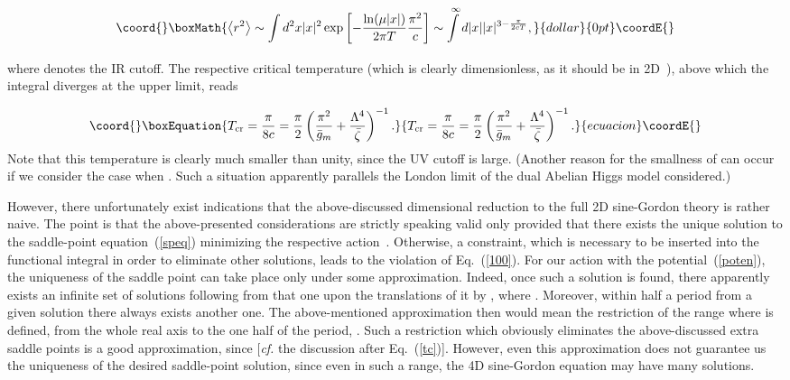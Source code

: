 \documentclass[a4paper,12pt]{article}
\begin{document}
$$\coord{}\boxMath{\left<r^2\right>\sim\int d^2x |x|^2\exp\left[-\frac{\ln(\mu|x|)}{2\pi T}\frac{\pi^2}{c}\right]\sim
\int\limits_{}^{\infty} d|x||x|^{3-\frac{\pi}{2cT}},}{dollar}{0pt}\coordE{}$$ 
where \myHighlight{$\mu$}\coordHE{} denotes the IR cutoff. The respective critical temperature (which is clearly dimensionless, as it 
should be in 2D~\cite{bkt}), above which the integral diverges at the upper limit, reads

\begin{equation}\coord{}\boxEquation{
\label{tc}
T_{\rm cr}=\frac{\pi}{8c}=\frac{\pi}{2}\left(\frac{\pi^2}{\bar g_m}+\frac{\Lambda^4}{\bar\zeta}\right)^{-1}.
}{
T_{\rm cr}=\frac{\pi}{8c}=\frac{\pi}{2}\left(\frac{\pi^2}{\bar g_m}+\frac{\Lambda^4}{\bar\zeta}\right)^{-1}.
}{ecuacion}\coordE{}\end{equation}
Note that this temperature is clearly much smaller than unity, since the UV cutoff \myHighlight{$\Lambda$}\coordHE{} is large.
(Another reason for the smallness of \coordHE{} can occur if we consider the case when \coordHE{}.
Such a situation apparently parallels the London limit of the dual Abelian Higgs model considered.)

However, there unfortunately exist indications that the above-discussed dimensional reduction to the full 2D sine-Gordon theory
is rather naive. The point is that the above-presented 
considerations are strictly speaking valid only provided that there exists the unique solution to the saddle-point
equation~(\ref{speq}) minimizing the respective action~\cite{Parisi}. Otherwise, a constraint, which is
necessary to be inserted into the functional integral in order to eliminate other solutions, leads to the violation of Eq.~(\ref{100}).
For our action with the potential~(\ref{poten}), the uniqueness of the saddle point can take place only under some approximation. Indeed, once 
such a solution is found, there apparently exists an infinite set of solutions following from that one upon the translations
of it by \coordHE{}, where \coordHE{}. Moreover, within half a period from a given solution there always exists another one.
The above-mentioned approximation then would mean the restriction 
of the range where \myHighlight{$\varphi$}\coordHE{} is defined, from the whole real axis to the one half of the period, \coordHE{}. 
Such a restriction which obviously eliminates the above-discussed extra saddle points is a good approximation, since \coordHE{} 
[{\it cf.} the discussion after Eq.~(\ref{tc})]. However, even this approximation does not guarantee us the uniqueness of the 
desired saddle-point solution, since even in such a range, the 4D sine-Gordon equation may have many solutions. 
\end{document}

